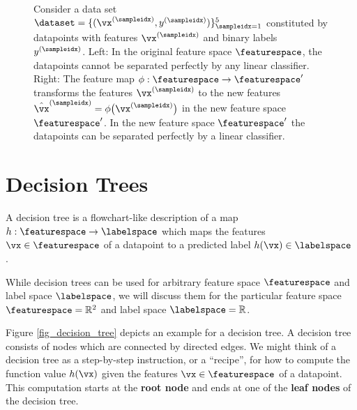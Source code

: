 \documentclass[12pt]{report}
\begin{document}
\begin{figure}[htbp]
\begin{center}
\begin{minipage}{0.45\textwidth}
\begin{tikzpicture}[auto,scale=0.6]
   \end{tikzpicture}
\end{minipage}
\caption{Consider a data set $\dataset = \{ (\vx^{(\sampleidx)},y^{(\sampleidx)}) \}_{\sampleidx=1}^{5}$ constituted 
by datapoints with features $\vx^{(\sampleidx)}$ and binary labels $y^{(\sampleidx)}$. Left: In the original feature 
space $\featurespace$, the datapoints cannot be separated perfectly by any linear classifier. Right: The feature 
map $\phi: \featurespace \rightarrow \featurespace'$ transforms the features $\vx^{(\sampleidx)}$ to the new features 
$\hat{\vx}^{(\sampleidx)}=\phi\big(\vx^{(\sampleidx)}\big)$ in the new feature space $\featurespace'$. In the new 
feature space $\featurespace'$ the datapoints can be separated perfectly by a linear classifier. }
\label{fig_kernelmethods}
\end{center}
\end{figure}


\newpage
\section{Decision Trees} 
\label{sec_decision_trees}

A decision tree is a flowchart-like description of a map 
$h: \featurespace \rightarrow \labelspace$ which maps 
the features $\vx \in \featurespace$ of a datapoint to a 
predicted label $h(\vx) \in \labelspace$ \cite{hastie01statisticallearning}. 

While decision trees can be used for arbitrary feature space 
$\featurespace$ and label space $\labelspace$, we will discuss 
them for the particular feature space $\featurespace = \mathbb{R}^{2}$ 
and label space $\labelspace=\mathbb{R}$. %

Figure \ref{fig_decision_tree} depicts an example for a decision tree. 
A decision tree consists of nodes which are connected by directed edges. 
We might think of a decision tree as a step-by-step instruction, 
or a ``recipe'', for how to compute the function value $h(\vx)$ 
given the features $\vx \in \featurespace$ of a datapoint. This 
computation starts at the {\bf root node} and ends at one of 
the {\bf leaf nodes} of the decision tree. 
\end{document}
